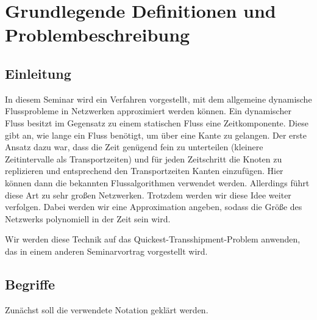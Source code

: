 
\section{Grundlegende Definitionen und Problembeschreibung}\label{sec:problem}

\subsection{Einleitung}

In diesem Seminar wird ein Verfahren vorgestellt, mit dem allgemeine dynamische
Flussprobleme in Netzwerken approximiert werden können. Ein dynamischer Fluss
besitzt im
Gegensatz zu einem statischen Fluss eine Zeitkomponente. Diese gibt an, wie
lange ein Fluss benötigt, um über eine Kante zu gelangen. Der erste Ansatz
dazu war, dass die Zeit genügend fein zu unterteilen (kleinere Zeitintervalle
als Transportzeiten) und für jeden Zeitschritt die Knoten zu replizieren und
entsprechend den Transportzeiten Kanten einzufügen. Hier können dann die
bekannten Flussalgorithmen verwendet werden. Allerdings führt diese Art
zu sehr großen Netzwerken. Trotzdem werden wir diese Idee weiter verfolgen.
Dabei werden wir eine Approximation angeben, sodass die Größe des Netzwerks
polynomiell in der Zeit sein wird.

Wir werden diese Technik auf das Quickest-Transshipment-Problem anwenden,
das in einem anderen Seminarvortrag vorgestellt wird.

\subsection{Begriffe}
Zunächst soll die verwendete Notation geklärt werden.

